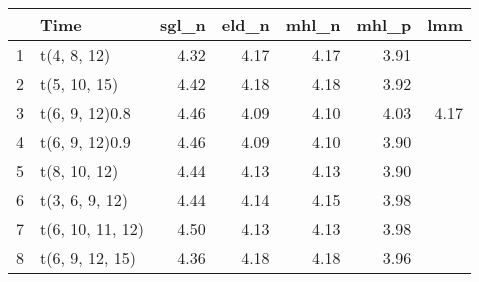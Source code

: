 \begin{table}[ht]
\centering
\begin{tabular}{rlrrrrr}
  \hline
 & Time & sgl\_n & eld\_n & mhl\_n & mhl\_p & lmm \\ 
  \hline
1 & t(4, 8, 12) & 4.32 & 4.17 & 4.17 & 3.91 &  \\ 
  2 & t(5, 10, 15) & 4.42 & 4.18 & 4.18 & 3.92 &  \\ 
  3 & t(6, 9, 12)0.8 & 4.46 & 4.09 & 4.10 & 4.03 & 4.17 \\ 
  4 & t(6, 9, 12)0.9 & 4.46 & 4.09 & 4.10 & 3.90 &  \\ 
  5 & t(8, 10, 12) & 4.44 & 4.13 & 4.13 & 3.90 &  \\ 
  6 & t(3, 6, 9, 12) & 4.44 & 4.14 & 4.15 & 3.98 &  \\ 
  7 & t(6, 10, 11, 12) & 4.50 & 4.13 & 4.13 & 3.98 &  \\ 
  8 & t(6, 9, 12, 15) & 4.36 & 4.18 & 4.18 & 3.96 &  \\ 
   \hline
\end{tabular}
\end{table}
